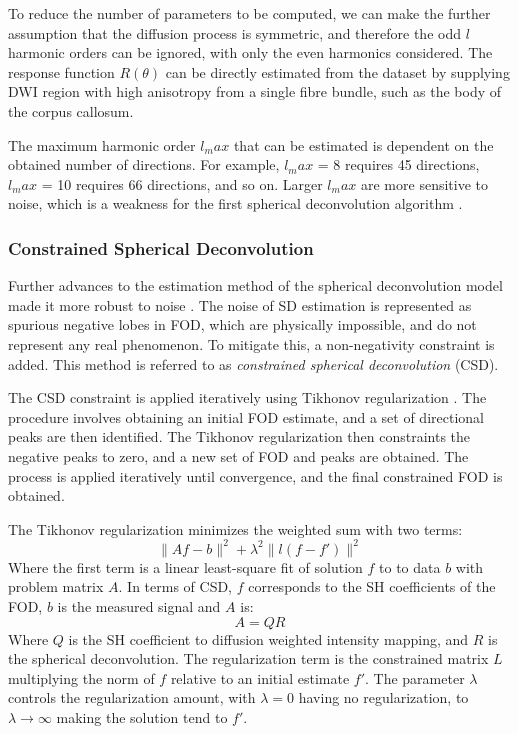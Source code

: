 To reduce the number of parameters to be computed, we can make the further assumption that the diffusion process is symmetric, and therefore the odd $l$ harmonic orders can be ignored, with only the even harmonics considered. 
The response function $R(\theta)$ can be directly estimated from the dataset by supplying DWI region with high anisotropy from a single fibre bundle, such as the body of the corpus callosum. 

The maximum harmonic order $l_max$ that can be estimated is dependent on the obtained number of directions. For example, $l_max$ = 8 requires 45 directions, $l_max$ = 10 requires 66 directions, and so on. Larger $l_max$ are more sensitive to noise, which is a weakness for the first spherical deconvolution algorithm \cite{Tournier2004}. 

\subsubsection{Constrained Spherical Deconvolution}
Further advances to the estimation method of the spherical deconvolution model made it more robust to noise \cite{Tournier2007b}. The noise of SD estimation is represented as spurious negative lobes in FOD, which are physically impossible, and do not represent any real phenomenon. To mitigate this, a non-negativity constraint is added. This method is referred to as \textit{constrained spherical deconvolution} (CSD). 

The CSD constraint is applied iteratively using Tikhonov regularization \cite{Hansen1998}. The procedure involves obtaining an initial FOD estimate, and a set of directional peaks are then identified. The Tikhonov regularization then constraints the negative peaks to zero, and a new set of FOD and peaks are obtained. The process is applied iteratively until convergence, and the final constrained FOD is obtained. 

The Tikhonov regularization minimizes the weighted sum with two terms:
\begin{equation}
\|{Af - b}\|^2 + \lambda^2 \| l(f - f')\|^2
\end{equation}
Where the first term is a linear least-square fit of solution $f$ to to data $b$ with problem matrix $A$. 
In terms of CSD, $f$ corresponds to the SH coefficients of the FOD, $b$ is the measured signal and $A$ is:
\begin{equation}
A = QR
\end{equation}
Where $Q$ is the SH coefficient to diffusion weighted intensity mapping, and $R$ is the spherical deconvolution. 
The regularization term is the constrained matrix $L$ multiplying the norm of $f$ relative to an initial estimate $f'$. The parameter $\lambda$ controls the regularization amount, with $\lambda=0$ having no regularization, to $\lambda\rightarrow \infty $ making the solution tend to $f'$. 

